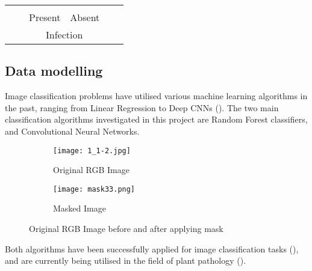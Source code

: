\documentclass[../../Paper.tex]{subfiles}
\begin{document}
\begin{table*}[!t]
\begin{tabular}{clllllll}
\multicolumn{1}{|c|}{}                          & \multicolumn{1}{l|}{}                         & \multicolumn{1}{l|}{}                                & \multicolumn{1}{l|}{}                                & \multicolumn{1}{l|}{}                                & \multicolumn{1}{l|}{}                                & \textbf{} & \textbf{} \\ \cline{1-6}
\multicolumn{1}{l}{}                            & \multicolumn{1}{l|}{}                         & \multicolumn{2}{l|}{Present}                                                                                & \multicolumn{2}{l|}{Absent}                                                                                 &           &           \\ \cline{3-6}
                                                & \multicolumn{1}{l|}{}                         & \multicolumn{4}{c|}{Infection} 
\\ \cline{3-6}                                              
\end{tabular}
\end{table*}


\subsection*{Data modelling}

Image classification problems have utilised various machine learning algorithms in the past, ranging from Linear Regression to Deep CNNs (\cite{naseem_linear_2010,krizhevsky_imagenet_2012,tripathi_recent_2016}).
The two main classification algorithms investigated in this project are Random Forest classifiers, and Convolutional Neural Networks. 


\begin{figure}[!b]
\centering
\begin{subfigure}{.4\textwidth}
  \centering
  \texttt{[image: 1\_1-2.jpg]}
  \caption{Original RGB Image}
  \label{fig:sub1}
\end{subfigure}%
\begin{subfigure}{.4\textwidth}
  \centering
  \texttt{[image: mask33.png]}
  \caption{Masked Image}
  \label{fig:sub2}
\end{subfigure}
\caption{Original RGB Image before and after applying mask}
\label{fig:test}
\end{figure}

Both algorithms have been successfully applied for image classification tasks (\cite{krizhevsky_imagenet_2012,malof_deep_2016}), and are currently being utilised in the field of plant pathology (\cite{awate_fruit_2015, singh_machine_2016}). 
\end{document}
